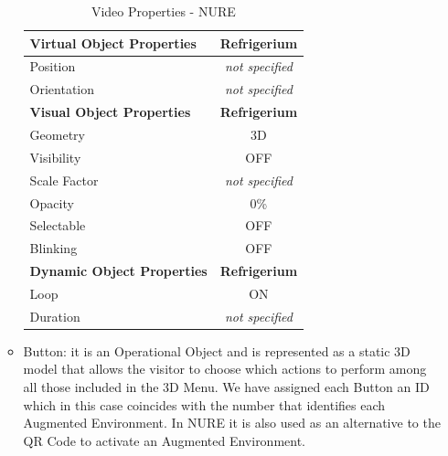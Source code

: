 \begin{itemize}
\begin{itemize}
        \begin{table}[h]
        \centering
        \begin{tabular}{|l|c|}
        \hline
        \textbf{Virtual Object Properties}                       & \textbf{Refrigerium}   \\ \hline
        Position                                                 & \textit{not specified} \\ \hline
        Orientation                                              & \textit{not specified} \\ \hline
        \textbf{Visual Object Properties}                        & \textbf{Refrigerium}   \\ \hline
        Geometry                                                 & 3D                     \\ \hline
        Visibility                                               & OFF                    \\ \hline
        Scale Factor                                             & \textit{not specified} \\ \hline
        Opacity                                                  & 0\%                    \\ \hline
        Selectable                                               & OFF                    \\ \hline
        Blinking                                                 & OFF                    \\ \hline
        \multicolumn{1}{|c|}{\textbf{Dynamic Object Properties}} & \textbf{Refrigerium}   \\ \hline
        Loop                                                     & ON                     \\ \hline
        Duration                                                 & \textit{not specified} \\ \hline
        \end{tabular}
        \caption{Video Properties - NURE}
        \label{tab:NUREVideoproperties}
        \end{table}
        
        \item Button: it is an Operational Object and is represented as a static 3D model that allows the visitor to choose which actions to perform among all those included in the 3D Menu. We have assigned each Button an ID which in this case coincides with the number that identifies each Augmented Environment. In NURE it is also used as an alternative to the QR Code to activate an Augmented Environment. 
        

\end{itemize}
\end{itemize}
